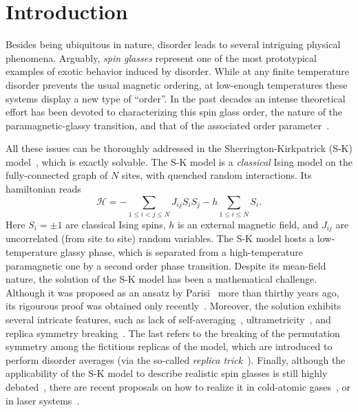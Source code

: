\documentclass[twocolumn,superscriptaddress,prb,10pt]{revtex4-1}
\begin{document}
\maketitle


\section{Introduction}


Besides being ubiquitous in nature, disorder leads to several intriguing 
physical phenomena. 
Arguably, \emph{spin glasses} represent one of the most prototypical examples
of exotic behavior induced by disorder.
While at any finite temperature disorder prevents the 
usual magnetic ordering, at low-enough temperatures these systems display a 
new type of ``order''. In the past decades an intense theoretical 
effort has been devoted to characterizing this spin glass order, the nature of 
the paramagnetic-glassy transition, and that of the associated order 
parameter~\cite{binder-1986,parisi-book,young-1998,nishimori-book,castellani-2005}. 

All these issues can be thoroughly addressed in the Sherrington-Kirkpatrick 
(S-K) model~\cite{sherrington-1978,sherrington-1978-prl}, which is exactly 
solvable. The S-K model is a \emph{classical} Ising model on the fully-connected 
graph of $N$ sites, with quenched random interactions. Its hamiltonian reads  
%
\begin{equation}
{\mathcal H}=-\sum\limits_{1\le i<j\le N}J_{ij}S_i S_j-
h\sum\limits_{1\le i\le N}S_i.
\label{SK-intro}
\end{equation}
%
Here $S_i=\pm 1$ are classical Ising spins, $h$ is an external magnetic field, and 
$J_{ij}$ are uncorrelated (from site to site) random variables. The S-K model hosts 
a low-temperature glassy phase, which is separated from a high-temperature paramagnetic 
one by a second order phase transition. Despite its mean-field nature, the solution 
of the S-K model has been a mathematical challenge. Although it was proposed as an 
ansatz by Parisi~\cite{parisi-1980} more than thirthy years ago, its rigourous proof 
was obtained only recently~\cite{talagrand-2006}. Moreover, the solution exhibits several 
intricate features, such as lack of self-averaging~\cite{pastur-1991}, ultrametricity~\cite{
mezard-1984,rammal-1986}, and replica symmetry breaking~\cite{parisi-book,castellani-2005}. 
The last refers to the breaking of the permutation symmetry among the fictitious replicas 
of the model, which are introduced to perform disorder averages (via the so-called 
\emph{replica trick}~\cite{cardy-book}). Finally, although the applicability of the S-K 
model to describe realistic spin glasses is still highly debated~\cite{yucesoy-2012,
billoire-2012,yucesoy-2013}, there are recent proposals on how to realize it  
in cold-atomic gases~\cite{morrison-2008,rotondo-2015}, or in laser systems~\cite{
ghofraniha-2015}. 
\end{document}

